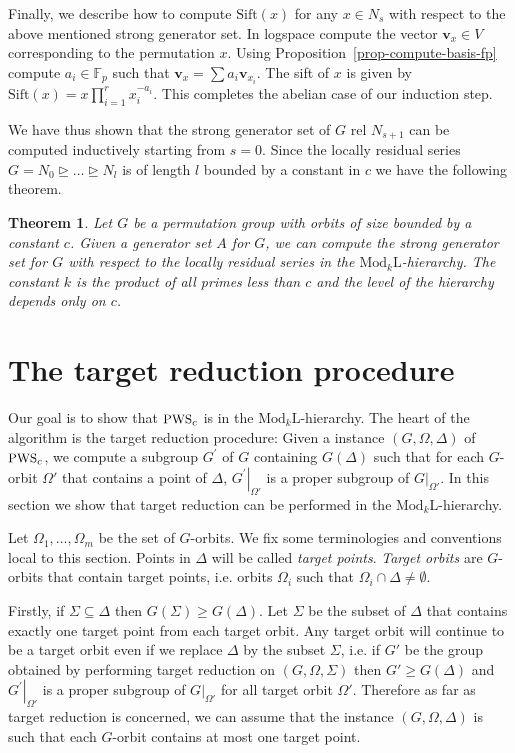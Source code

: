\documentclass[11pt]{madras}%
\newtheorem{theorem}{Theorem}[chapter]
\theoremstyle{remark}
\newcommand{\ModkL}[1]{{\ensuremath{\mathrm{Mod}_{#1}\mathrm{L}}}}
\newcommand{\ProblemFont}[1]{{\ensuremath{\textrm{\small #1}}}}
\newcommand{\pr}[2]{{\ensuremath{\left.{#1}\right\vert_{#2}}}}
\newcommand{\pointwise}[2]{{\ensuremath{#1\left(#2\right)}}}
\newcommand{\Sift}[1]{{\ensuremath{\mathrm{Sift}({#1})}}}
\begin{document}
Finally, we describe how to compute $\Sift{x}$ for any $x \in N_s$
with respect to the above mentioned strong generator set. In logspace
compute the vector $\mathbf{v}_x \in V$ corresponding to the
permutation $x$.  Using Proposition~\ref{prop-compute-basis-fp}
compute $a_i \in \mathbb{F}_p$ such that $\mathbf{v}_x = \sum a_i
\mathbf{v}_{x_i}$.  The sift of $x$ is given by
$\Sift{x}=x\prod_{i=1}^r x_i^{-a_i}$. This completes the abelian case
of our induction step.

We have thus shown that the strong generator set of $G$ rel $N_{s+1}$
can be computed inductively starting from $s = 0$. Since the locally
residual series $G = N_0 \unrhd \ldots \unrhd N_l$ is of length $l$
bounded by a constant in $c$ we have the following theorem.

\begin{theorem}\label{thm-SGS}
  Let $G$ be a permutation group with orbits of size bounded by a
  constant $c$. Given a generator set $A$ for $G$, we can compute the
  strong generator set for $G$ with respect to the locally residual
  series in the $\ModkL{k}$-hierarchy. The constant $k$ is the product
  of all primes less than $c$ and the level of the hierarchy depends
  only on $c$.
\end{theorem}
\section{The target reduction procedure}
\label{sect-target-reduction}

Our goal is to show that $\ProblemFont{PWS}_c$ is in the
$\ModkL{k}$-hierarchy.  The heart of the algorithm is the target
reduction procedure: Given a instance $(G,\Omega,\Delta)$ of
$\ProblemFont{PWS}_c$, we compute a subgroup $G^\prime$ of $G$
containing $\pointwise{G}{\Delta}$ such that for each $G$-orbit
$\Omega'$ that contains a point of $\Delta$, $\pr{G^\prime}{\Omega'}$
is a proper subgroup of $\pr{G}{\Omega'}$. In this section we show
that target reduction can be performed in the $\ModkL{k}$-hierarchy.

Let $\Omega_1, \ldots, \Omega_m$ be the set of $G$-orbits.  We fix
some terminologies and conventions local to this section. Points in
$\Delta$ will be called \emph{target points}. \emph{Target orbits} are
$G$-orbits that contain target points, i.e. orbits $\Omega_i$ such
that $\Omega_i \cap \Delta \neq \emptyset$.

Firstly, if $\Sigma \subseteq \Delta$ then $\pointwise{G}{\Sigma} \geq
\pointwise{G}{\Delta}$. Let $\Sigma$ be the subset of $\Delta$ that
contains exactly one target point from each target orbit. Any target
orbit will continue to be a target orbit even if we replace $\Delta$
by the subset $\Sigma$, i.e. if $G'$ be the group obtained by
performing target reduction on $(G,\Omega,\Sigma)$ then $G' \geq
\pointwise{G}{\Delta}$ and $\pr{G^\prime}{\Omega'}$ is a proper
subgroup of $\pr{G}{\Omega'}$ for all target orbit $\Omega'$.
Therefore as far as target reduction is concerned, we can assume that
the instance $(G,\Omega,\Delta)$ is such that each $G$-orbit contains
at most one target point.
\end{document}
